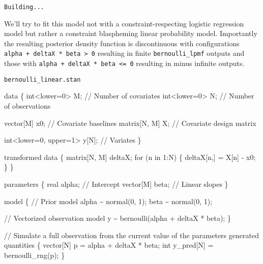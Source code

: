 \documentclass[
  letterpaper,
  DIV=11,
  numbers=noendperiod]{scrartcl}
\newenvironment{Shaded}{\begin{snugshade}}{\end{snugshade}}
\newcommand{\CommentTok}[1]{\textcolor[rgb]{0.37,0.37,0.37}{#1}}
\newcommand{\ControlFlowTok}[1]{\textcolor[rgb]{0.00,0.23,0.31}{#1}}
\newcommand{\DataTypeTok}[1]{\textcolor[rgb]{0.68,0.00,0.00}{#1}}
\newcommand{\DecValTok}[1]{\textcolor[rgb]{0.68,0.00,0.00}{#1}}
\newcommand{\KeywordTok}[1]{\textcolor[rgb]{0.00,0.23,0.31}{#1}}
\newcommand{\NormalTok}[1]{\textcolor[rgb]{0.00,0.23,0.31}{#1}}
\begin{document}
\begin{verbatim}
Building...
\end{verbatim}

We'll try to fit this model not with a constraint-respecting logistic
regression model but rather a constraint blaspheming linear probability
model. Importantly the resulting posterior density function is
discontinuous with configurations
\texttt{alpha\ +\ deltaX\ *\ beta\ \textgreater{}\ 0} resulting in
finite \texttt{bernoulli\_lpmf} outputs and those with
\texttt{alpha\ +\ deltaX\ *\ beta\ \textless{}=\ 0} resulting in minus
infinite outputs.

\begin{codelisting}

\caption{\texttt{bernoulli\_linear.stan}}

\begin{Shaded}
\begin{Highlighting}[]
\KeywordTok{data}\NormalTok{ \{}
  \DataTypeTok{int}\NormalTok{\textless{}}\KeywordTok{lower}\NormalTok{=}\DecValTok{0}\NormalTok{\textgreater{} M; }\CommentTok{// Number of covariates}
  \DataTypeTok{int}\NormalTok{\textless{}}\KeywordTok{lower}\NormalTok{=}\DecValTok{0}\NormalTok{\textgreater{} N; }\CommentTok{// Number of observations}
  
  \DataTypeTok{vector}\NormalTok{[M] x0;   }\CommentTok{// Covariate baselines}
  \DataTypeTok{matrix}\NormalTok{[N, M] X; }\CommentTok{// Covariate design matrix}
  
  \DataTypeTok{int}\NormalTok{\textless{}}\KeywordTok{lower}\NormalTok{=}\DecValTok{0}\NormalTok{, }\KeywordTok{upper}\NormalTok{=}\DecValTok{1}\NormalTok{\textgreater{} y[N]; }\CommentTok{// Variates}
\NormalTok{\}}

\KeywordTok{transformed data}\NormalTok{ \{}
  \DataTypeTok{matrix}\NormalTok{[N, M] deltaX;}
  \ControlFlowTok{for}\NormalTok{ (n }\ControlFlowTok{in} \DecValTok{1}\NormalTok{:N) \{}
\NormalTok{    deltaX[n,] = X[n] {-} x0\textquotesingle{};}
\NormalTok{  \}}
\NormalTok{\}}

\KeywordTok{parameters}\NormalTok{ \{}
  \DataTypeTok{real}\NormalTok{ alpha;      }\CommentTok{// Intercept}
  \DataTypeTok{vector}\NormalTok{[M] beta;  }\CommentTok{// Linear slopes}
\NormalTok{\}}

\KeywordTok{model}\NormalTok{ \{}
  \CommentTok{// Prior model}
\NormalTok{  alpha \textasciitilde{} normal(}\DecValTok{0}\NormalTok{, }\DecValTok{1}\NormalTok{);}
\NormalTok{  beta \textasciitilde{} normal(}\DecValTok{0}\NormalTok{, }\DecValTok{1}\NormalTok{);}

  \CommentTok{// Vectorized observation model}
\NormalTok{  y \textasciitilde{} bernoulli(alpha + deltaX * beta);}
\NormalTok{\}}

\CommentTok{// Simulate a full observation from the current value of the parameters}
\KeywordTok{generated quantities}\NormalTok{ \{}
  \DataTypeTok{vector}\NormalTok{[N] p = alpha + deltaX * beta;}
  \DataTypeTok{int}\NormalTok{ y\_pred[N] = bernoulli\_rng(p);}
\NormalTok{\}}
\end{Highlighting}
\end{Shaded}

\end{codelisting}
\end{document}
